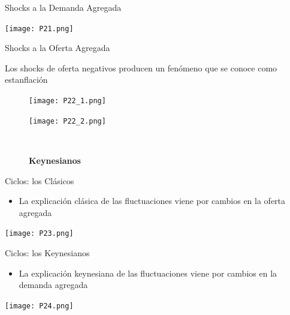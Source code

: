 \documentclass{beamer}
\begin{document}
\begin{frame}{Shocks a la Demanda Agregada}
    
\centering\texttt{[image: P21.png]}\
    
\end{frame}


\begin{frame}{Shocks a la Oferta Agregada}

Los shocks de oferta negativos  producen un fenómeno que se conoce como estanflación

\begin{figure} [H]
\centering
\begin{minipage}{.5\textwidth}
  \centering
  \texttt{[image: P22\_1.png]}
  \caption{\textbf{Clásicos}}
  \label{a}
\end{minipage}%
\begin{minipage}{.5\textwidth}
  \centering
  \texttt{[image: P22\_2.png]}
  \caption{\textbf{Keynesianos}}
  \label{b}
\end{minipage}
\\
\end{figure}

\end{frame}


\begin{frame}{Ciclos: los Clásicos}

\begin{itemize}
    \item La explicación clásica de las fluctuaciones viene por cambios en la oferta agregada
\end{itemize}

\vspace{2mm}

\centering\texttt{[image: P23.png]}\

\end{frame}


\begin{frame}{Ciclos: los Keynesianos}

\begin{itemize}
    \item La explicación keynesiana de las fluctuaciones viene por cambios en la demanda agregada
\end{itemize}

\vspace{2mm}

\centering\texttt{[image: P24.png]}\

\end{frame}
\end{document}
